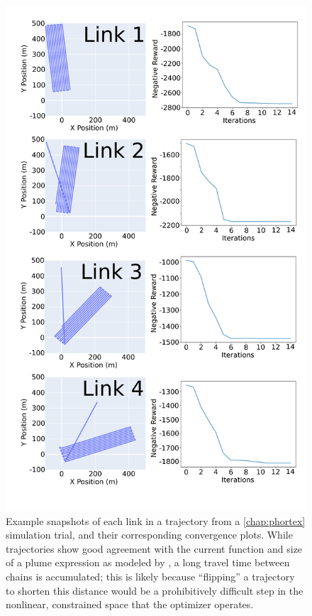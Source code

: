 \begin{figure}[h!]
    \centering
    \includegraphics[width=0.7\columnwidth]{figures/phortex_iterations.png}
    \caption[\PHORTEX optimization performance]{Example snapshots of each link in a \PHORTEX trajectory from a \cref{chap:phortex} simulation trial, and their corresponding convergence plots. While trajectories show good agreement with the current function and size of a plume expression as modeled by \PHUMES, a long travel time between chains is accumulated; this is likely because ``flipping'' a trajectory to shorten this distance would be a prohibitively difficult step in the nonlinear, constrained space that the optimizer operates.}
    \label{fig:phortex_chain}
\end{figure}

